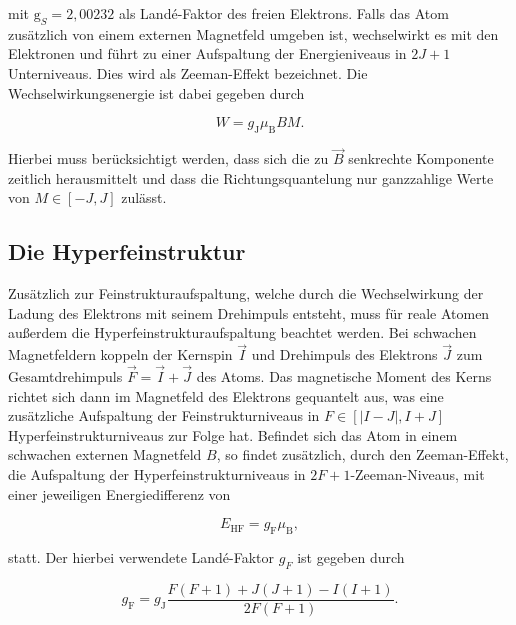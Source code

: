 \noindent
mit $\text{g}_S=2{,}00232$ als Landé-Faktor des freien Elektrons.
Falls das Atom zusätzlich von einem externen Magnetfeld umgeben ist, wechselwirkt es mit den Elektronen und führt zu einer Aufspaltung der Energieniveaus in $2J+1$ Unterniveaus. 
Dies wird als Zeeman-Effekt bezeichnet. Die Wechselwirkungsenergie ist dabei gegeben durch

\begin{equation}
  W = g_\text{J}\mu_\text{B}BM.
\end{equation}

\noindent
Hierbei muss berücksichtigt werden, dass sich die zu $\vec{B}$ senkrechte Komponente zeitlich herausmittelt und dass die Richtungsquantelung nur ganzzahlige
Werte von $M \in [-J,J]$ zulässt.


\subsection{Die Hyperfeinstruktur}
\label{subsec:Hyperfein}

Zusätzlich zur Feinstrukturaufspaltung, welche durch die Wechselwirkung der Ladung des Elektrons mit seinem Drehimpuls entsteht, muss für
reale Atomen außerdem die Hyperfeinstrukturaufspaltung beachtet werden.
\newline
Bei schwachen Magnetfeldern koppeln der Kernspin $\vec{I}$ und Drehimpuls des Elektrons $\vec{J}$ zum Gesamtdrehimpuls $\vec{F}=\vec{I}+\vec{J}$ des Atoms.
Das magnetische Moment des Kerns richtet sich dann im Magnetfeld des Elektrons gequantelt aus, was eine zusätzliche Aufspaltung der Feinstrukturniveaus
in $F \in [|I-J|,I+J]$ Hyperfeinstrukturniveaus zur Folge hat.
\newline \newline
Befindet sich das Atom in einem schwachen externen Magnetfeld $B$, so findet zusätzlich, durch den Zeeman-Effekt, die Aufspaltung der Hyperfeinstrukturniveaus
in $2F+1$-Zeeman-Niveaus, mit einer jeweiligen Energiedifferenz von


\begin{equation}
  E_\text{HF}=g_\text{F}\mu_\text{B},
\end{equation}

\noindent
statt. Der hierbei verwendete Landé-Faktor $g_F$ ist gegeben durch

\begin{equation}
  g_\text{F}=g_\text{J}\frac{F(F+1)+J(J+1)-I(I+1)}{2F(F+1)}.
  \label{eq:gf}
\end{equation}


